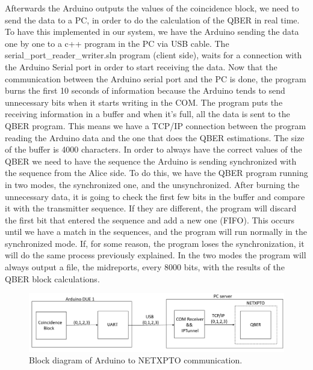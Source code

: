 \begin{refsection}
		Afterwards the Arduino outputs the values of the coincidence block, we need to send the data to a PC, in order to do the calculation of the QBER in real time. To have this implemented in our system, we have the Arduino sending the data one by one to a c++ program in the PC via USB cable. The serial\_port\_reader\_writer.sln program (client side), waits for a connection with the Arduino Serial port in order to start receiving the data. Now that the communication between the Arduino serial port and the PC is done, the program burns the first 10 seconds of information because the Arduino tends to send unnecessary bits when it starts writing in the COM. The program puts the receiving information in a buffer and when it's full, all the data is sent to the QBER program. This means we have a TCP/IP connection between the program reading the Arduino data and the one that does the QBER estimations. The size of the buffer is 4000 characters. In order to always have the correct values of the QBER we need to have the sequence the Arduino is sending synchronized with the sequence from the Alice side. To do this, we have the QBER program running in two modes, the synchronized one, and the unsynchronized. After burning the unnecessary data, it is going to check the first few bits in the buffer and compare it with the transmitter sequence. If they are different, the program will discard the first bit that entered the sequence and add a new one (FIFO). This occurs until we have a match in the sequences, and the program will run normally in the synchronized mode. If, for some reason, the program loses the synchronization, it will do the same process previously explained. In the two modes the program will always output a file, the midreports, every 8000 bits, with the results of the QBER block calculations. 
		
		\begin{figure}[H]
			\centering
			\includegraphics[width=1\linewidth]{./sdf/arduino_quantum_rx/figures/PC.png}
			\caption{Block diagram of Arduino to NETXPTO communication.}
			\label{fig:netxpto}
		\end{figure}
	
	

\end{refsection}
